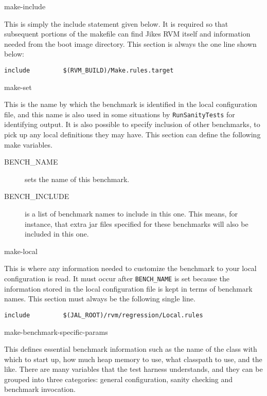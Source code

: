 \begin{description}
\begin{Label}{make-include}
\item[Include the environment rules from the current build directory]
This is simply the include statement given below.  It is required so
that subsequent portions of the makefile can find Jikes RVM itself
and information needed from the boot image directory.  This section
is always the one line shown below:
\begin{verbatim}
include         $(RVM_BUILD)/Make.rules.target
\end{verbatim}
\end{Label}

\begin{Label}{make-set}
\item[Set the benchmark name]
This is the name by which the benchmark
is identified in the local configuration file, and this name is also
used in some situations by {\tt{RunSanityTests}} for identifying
output.  It is also possible to specify inclusion of other benchmarks,
to pick up any local definitions they may have.  This section can
define the following make variables.
\begin{description}
\item[BENCH\_NAME] sets the name of this benchmark.  
\item[BENCH\_INCLUDE] is a list of benchmark names to include in this
one.  This means, for instance, that extra jar files specified for
these benchmarks will also be included in this one.
\end{description}
\end{Label}


\begin{Label}{make-local}
\item[Include local configuration information, if needed]
This is
where any information needed to customize the benchmark to your local
configuration is read.  It must occur after {\tt{BENCH\_NAME}} is set
because the information stored in the local configuration file is kept
in terms of benchmark names.  This section must always be the
following single line.
\begin{verbatim}
include         $(JAL_ROOT)/rvm/regression/Local.rules
\end{verbatim}
\end{Label}


\begin{Label}{make-benchmark-specific-params}
\item[Define benchmark-specific parameters]
  This defines essential
benchmark information such as the name of the class with which to
start up, how much heap memory to use, what classpath to use, and the
like.  There are many variables that the test harness understands, and
they can be grouped into three categories: general configuration,
sanity checking and benchmark invocation.


\end{Label}
\end{description}
